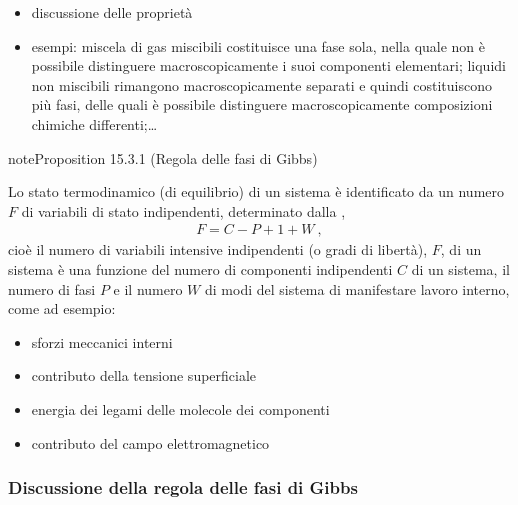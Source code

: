 \documentclass[letterpaper,10pt,italian]{jupyterBook}
\begin{document}
\sphinxAtStartPar
{}
\begin{itemize}
\item {} 
\sphinxAtStartPar
discussione delle proprietà

\item {} 
\sphinxAtStartPar
esempi: miscela di gas miscibili costituisce una fase sola, nella quale non è possibile distinguere macroscopicamente i suoi componenti elementari; liquidi non miscibili rimangono macroscopicamente separati e quindi costituiscono più fasi, delle quali è possibile distinguere macroscopicamente composizioni chimiche differenti;…

\end{itemize}
\label{ch/thermodynamics/principles-gibbs-phase-rule:proposition-4}
\begin{sphinxadmonition}{note}{Proposition 15.3.1 (Regola delle fasi di Gibbs)}



\sphinxAtStartPar
Lo stato termodinamico (di equilibrio) di un sistema è identificato da un numero \(F\) di variabili di stato  indipendenti, determinato dalla ,
\begin{equation*}
\begin{split}F = C - P + 1 + W \ ,\end{split}
\end{equation*}
\sphinxAtStartPar
cioè il numero di variabili intensive indipendenti (o gradi di libertà), \(F\), di un sistema è una funzione del numero di componenti indipendenti \(C\) di un sistema, il numero di fasi \(P\) e il numero \(W\) di modi del sistema di manifestare lavoro interno, come ad esempio:
\begin{itemize}
\item {} 
\sphinxAtStartPar
sforzi meccanici interni

\item {} 
\sphinxAtStartPar
contributo della tensione superficiale

\item {} 
\sphinxAtStartPar
energia dei legami delle molecole dei componenti

\item {} 
\sphinxAtStartPar
contributo del campo elettromagnetico

\end{itemize}
\end{sphinxadmonition}
\subsubsection*{Discussione della regola delle fasi di Gibbs}
\end{document}
